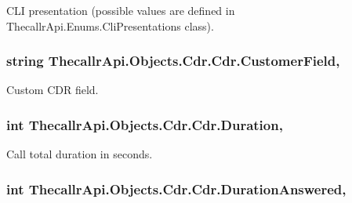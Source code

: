 C\+L\+I presentation (possible values are defined in Thecallr\+Api.\+Enums.\+Cli\+Presentations class). 

\hypertarget{class_thecallr_api_1_1_objects_1_1_cdr_1_1_cdr_ac7353fb9e4082e4666e0dda7073744e4}{
\subsubsection[{Customer\+Field}]{\setlength{\rightskip}{0pt plus 5cm}string Thecallr\+Api.\+Objects.\+Cdr.\+Cdr.\+Customer\+Field\hspace{0.3cm}{\ttfamily [get]}, {\ttfamily [set]}}}\label{class_thecallr_api_1_1_objects_1_1_cdr_1_1_cdr_ac7353fb9e4082e4666e0dda7073744e4}


Custom C\+D\+R field. 

\hypertarget{class_thecallr_api_1_1_objects_1_1_cdr_1_1_cdr_ad0320e61db4b940615d5e14605e50bc8}{
\subsubsection[{Duration}]{\setlength{\rightskip}{0pt plus 5cm}int Thecallr\+Api.\+Objects.\+Cdr.\+Cdr.\+Duration\hspace{0.3cm}{\ttfamily [get]}, {\ttfamily [set]}}}\label{class_thecallr_api_1_1_objects_1_1_cdr_1_1_cdr_ad0320e61db4b940615d5e14605e50bc8}


Call total duration in seconds. 

\hypertarget{class_thecallr_api_1_1_objects_1_1_cdr_1_1_cdr_a81c5af1816a5aa69e050ca01e8080edc}{
\subsubsection[{Duration\+Answered}]{\setlength{\rightskip}{0pt plus 5cm}int Thecallr\+Api.\+Objects.\+Cdr.\+Cdr.\+Duration\+Answered\hspace{0.3cm}{\ttfamily [get]}, {\ttfamily [set]}}}\label{class_thecallr_api_1_1_objects_1_1_cdr_1_1_cdr_a81c5af1816a5aa69e050ca01e8080edc}


